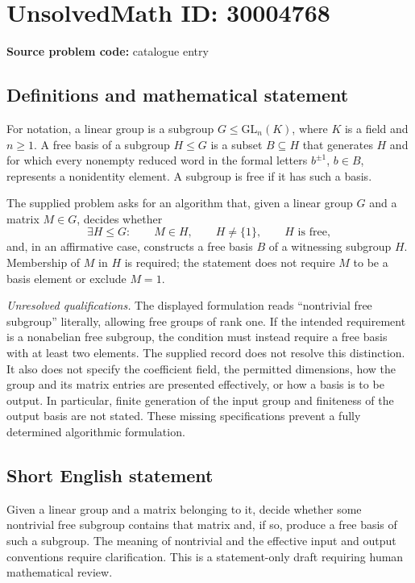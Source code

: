\documentclass[11pt]{article}
\begin{document}
\section*{UnsolvedMath ID: 30004768}
\textbf{Source problem code:} catalogue entry
\subsection{Definitions and mathematical statement}
For notation, a linear group is a subgroup \(G\leq \mathrm{GL}_n(K)\), where \(K\) is a field and \(n\geq 1\). A free basis of a subgroup \(H\leq G\) is a subset \(B\subseteq H\) that generates \(H\) and for which every nonempty reduced word in the formal letters \(b^{\pm1}\), \(b\in B\), represents a nonidentity element. A subgroup is free if it has such a basis.

The supplied problem asks for an algorithm that, given a linear group \(G\) and a matrix \(M\in G\), decides whether
\[
\exists H\leq G:\qquad M\in H,\qquad H\neq\{1\},\qquad H\text{ is free},
\]
and, in an affirmative case, constructs a free basis \(B\) of a witnessing subgroup \(H\). Membership of \(M\) in \(H\) is required; the statement does not require \(M\) to be a basis element or exclude \(M=1\).

\textit{Unresolved qualifications.} The displayed formulation reads ``nontrivial free subgroup'' literally, allowing free groups of rank one. If the intended requirement is a nonabelian free subgroup, the condition must instead require a free basis with at least two elements. The supplied record does not resolve this distinction. It also does not specify the coefficient field, the permitted dimensions, how the group and its matrix entries are presented effectively, or how a basis is to be output. In particular, finite generation of the input group and finiteness of the output basis are not stated. These missing specifications prevent a fully determined algorithmic formulation.
\subsection{Short English statement}
Given a linear group and a matrix belonging to it, decide whether some nontrivial free subgroup contains that matrix and, if so, produce a free basis of such a subgroup. The meaning of nontrivial and the effective input and output conventions require clarification. This is a statement-only draft requiring human mathematical review.
\end{document}
